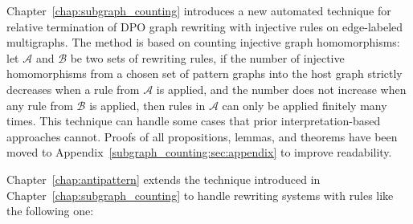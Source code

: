 Chapter~\ref{chap:subgraph_counting} introduces a new automated technique for relative termination of DPO graph rewriting with injective rules on edge-labeled multigraphs.
The method is based on counting injective graph homomorphisms: let $\mathcal{A}$ and $\mathcal{B}$ be two sets of rewriting rules, if the number of injective homomorphisms from a chosen set of pattern graphs into the host graph strictly decreases when a rule from $\mathcal{A}$ is applied, and the number does not increase when any rule from $\mathcal{B}$ is applied, then rules in $\mathcal{A}$ can only be applied finitely many times. This technique can handle some cases that prior interpretation-based approaches cannot.
Proofs of all propositions, lemmas, and theorems have been moved to Appendix~\ref{subgraph_counting:sec:appendix} to improve readability.

Chapter~\ref{chap:antipattern} extends the technique introduced in Chapter~\ref{chap:subgraph_counting} to handle rewriting systems with rules like the following one:

